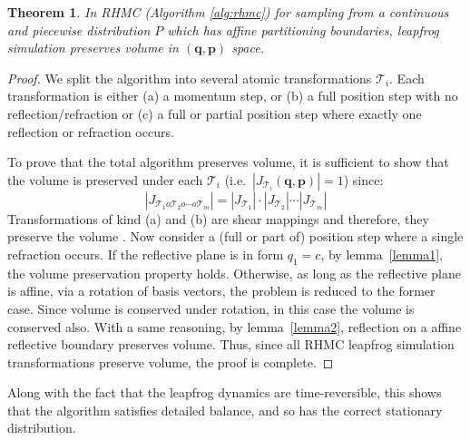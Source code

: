 \documentclass{article} %
\newtheorem{theorem}{Theorem}
\newcommand{\bvec}[1]{\textbf{#1}}
\begin{document}
\begin{theorem}
In RHMC (Algorithm \ref{alg:rhmc}) for sampling from a continuous and piecewise distribution $P$ which has affine partitioning boundaries, leapfrog simulation preserves volume in $(\bvec{q}, \bvec{p})$ space.
\end{theorem}
%
\begin{proof}
We split the algorithm into several atomic transformations $\mathcal{T}_i$.  Each transformation is either (a) a momentum step, or (b) a full position step with no reflection/refraction or (c) a full or partial position step where exactly one reflection or refraction occurs. 

To prove that the total algorithm preserves volume,
it is sufficient to show that the volume is preserved under each $\mathcal{T}_i$ 
(i.e.\ $|J_{\mathcal{T}_i}(\bvec{q}, \bvec{p})| = 1$) since:
\begin{equation*}
\left|J_{\mathcal{T}_1 o \mathcal{T}_2 o \cdots o \mathcal{T}_m} \right| = 
\left|J_{\mathcal{T}_1}  \right| \cdot 
\left|J_{\mathcal{T}_2}  \right| \cdots 
\left|J_{\mathcal{T}_m} \right| 
\end{equation*} 
Transformations of kind (a) and (b) are shear mappings 
and therefore, they preserve the volume \cite{neal2011mcmc}.  
Now consider a (full or part of) position step where a single refraction occurs. 
If the reflective plane is in form $q_1 = c$, by lemma~\ref{lemma1}, the volume preservation property holds.
Otherwise, as long as the reflective plane is affine, via a rotation of basis vectors, the problem is reduced to the former case. Since volume is conserved under rotation, in this case the volume is conserved also.
With a same reasoning, by lemma~\ref{lemma2}, reflection on a affine reflective boundary preserves volume. Thus, since all RHMC leapfrog simulation transformations preserve volume, the proof is complete.  
\end{proof}
Along with the fact that the leapfrog dynamics are time-reversible, this shows that the algorithm satisfies detailed balance, and so has the correct stationary distribution.
\end{document}

